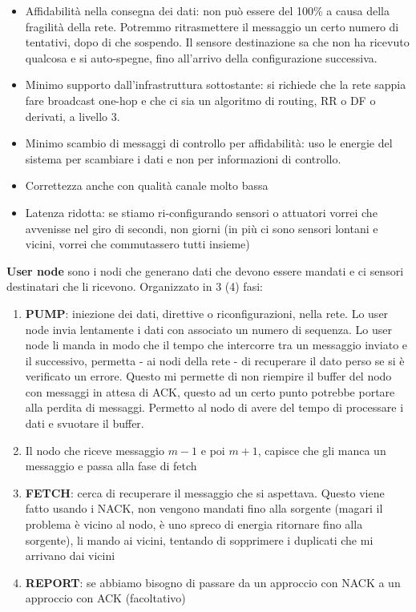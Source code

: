 \documentclass[12pt,italian]{report}
\begin{document}
\begin{itemize}
    \item Affidabilità nella consegna dei dati: non può essere del 100\% a causa della fragilità della rete. Potremmo ritrasmettere il messaggio un certo numero di tentativi, dopo di che sospendo. Il sensore destinazione sa che non ha ricevuto qualcosa e si auto-spegne, fino all'arrivo della configurazione successiva. 
    \item Minimo supporto dall'infrastruttura sottostante: si richiede che la rete sappia fare broadcast one-hop e che ci sia un algoritmo di routing, RR o DF o derivati, a livello 3.
    \item Minimo scambio di messaggi di controllo per affidabilità: uso le energie del sistema per scambiare i dati e non per informazioni di controllo.
    \item Correttezza anche con qualità canale molto bassa
    \item Latenza ridotta: se stiamo ri-configurando sensori o attuatori vorrei che avvenisse nel giro di secondi, non giorni (in più ci sono sensori lontani e vicini, vorrei che commutassero tutti insieme)
\end{itemize}

\noindent \textbf{User node} sono i nodi che generano dati che devono essere mandati e ci sensori destinatari che li ricevono. 
\bigbreak
\noindent Organizzato in 3 (4) fasi:
\begin{enumerate}
    \item \textbf{PUMP}: iniezione dei dati, direttive o riconfigurazioni, nella rete. Lo user node invia lentamente i dati con associato un numero di sequenza. Lo user node li manda in modo che il tempo che intercorre tra un messaggio inviato e il successivo, permetta - ai nodi della rete - di recuperare il dato perso se si è verificato un errore. Questo mi permette di non riempire il buffer del nodo con messaggi in attesa di ACK, questo ad un certo punto potrebbe portare alla perdita di messaggi. Permetto al nodo di avere del tempo di processare i dati e svuotare il buffer. 
    \item Il nodo che riceve messaggio $m-1$ e poi $m+1$, capisce che gli manca un messaggio e passa alla fase di fetch
    \item \textbf{FETCH}: cerca di recuperare il messaggio che si aspettava. Questo viene fatto usando i NACK, non vengono mandati fino alla sorgente (magari il problema è vicino al nodo, è uno spreco di energia ritornare fino alla sorgente), li mando ai vicini, tentando di sopprimere i duplicati che mi arrivano dai vicini
    \item \textbf{REPORT}: se abbiamo bisogno di passare da un approccio con NACK a un approccio con ACK (facoltativo)
\end{enumerate}
\end{document}
